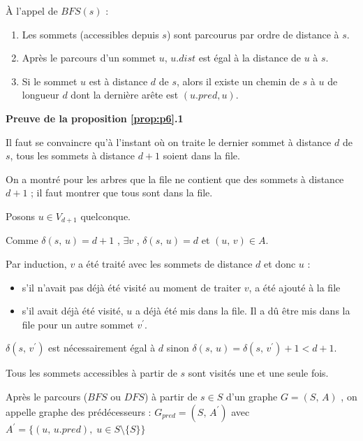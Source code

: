 

\begin{proposition}\label{prop:p6}
À l'appel de $BFS(s)$ :

\begin{enumerate}
\item Les sommets (accessibles depuis $s$) sont parcourus par ordre de distance à $s$.
\item Après le parcours d'un sommet $u$, $u.dist$ est égal à la distance de $u$ à $s$.
\item Si le sommet $u$ est à distance $d$ de $s$, alors il existe un chemin de $s$ à $u$ de longueur $d$ dont la dernière arête est $(u.pred, u)$.
\end{enumerate}
\end{proposition}


\textbf{\sffamily\small Preuve de la proposition \ref{prop:p6}.1}

Il faut se convaincre qu'à l'instant où on traite le dernier sommet à distance $d$ de $s$, tous les sommets à distance $d + 1$ soient dans la file.

On a montré pour les arbres que la file ne contient que des sommets à distance $d + 1$ ; il faut montrer que tous sont dans la file.

Posons $u \in V_{d+1}$ quelconque.

Comme $\delta(s,\, u) = d + 1$ , $\exists v$ , $\delta(s,\, u) = d$ et $(u,\, v) \in A$.

Par induction, $v$ a été traité avec les sommets de distance $d$ et donc $u$ :

\begin{itemize}
\item s'il n'avait pas déjà été visité au moment de traiter $v$, a été ajouté à la file 
\item s'il avait déjà été visité, $u$ a déjà été mis dans la file. Il a dû être mis dans la  file pour un autre sommet $v^{\prime}$.
\end{itemize}
$\delta(s,\, v^{\prime})$ est nécessairement égal à $d$ sinon $\delta(s,\, u) = \delta(s,\, v^{\prime}) + 1 < d + 1$.

\vspace{0.2cm}
\begin{proposition}\label{prop:p7}
Tous les sommets accessibles à partir de $s$ sont visités une et une seule fois.
\end{proposition}

\begin{definition}
Après le parcours ($BFS$ ou $DFS$) à partir de $s \in S$ d'un graphe $G = (S,\, A)$ , on appelle graphe des prédécesseurs :
$G_{pred} = (S,\, A^{\prime})$ avec $A^{\prime} = \lbrace(u,\, u.pred),\; u \in S \setminus \lbrace S \rbrace \rbrace$
\end{definition}

